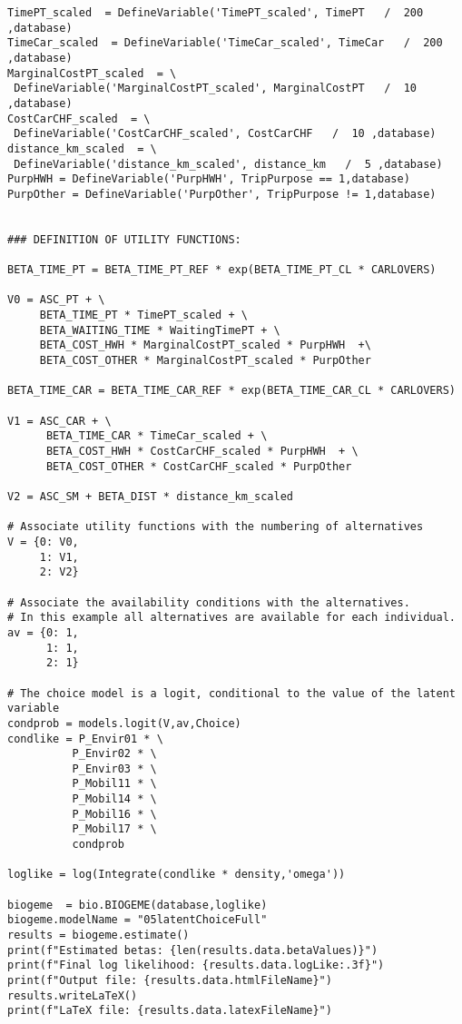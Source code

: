 \documentclass[12pt,a4paper]{article}
\begin{document}
\begin{lstlisting}[style=numbers]
TimePT_scaled  = DefineVariable('TimePT_scaled', TimePT   /  200 ,database)
TimeCar_scaled  = DefineVariable('TimeCar_scaled', TimeCar   /  200 ,database)
MarginalCostPT_scaled  = \
 DefineVariable('MarginalCostPT_scaled', MarginalCostPT   /  10 ,database)
CostCarCHF_scaled  = \
 DefineVariable('CostCarCHF_scaled', CostCarCHF   /  10 ,database)
distance_km_scaled  = \
 DefineVariable('distance_km_scaled', distance_km   /  5 ,database)
PurpHWH = DefineVariable('PurpHWH', TripPurpose == 1,database)
PurpOther = DefineVariable('PurpOther', TripPurpose != 1,database)


### DEFINITION OF UTILITY FUNCTIONS:

BETA_TIME_PT = BETA_TIME_PT_REF * exp(BETA_TIME_PT_CL * CARLOVERS)

V0 = ASC_PT + \
     BETA_TIME_PT * TimePT_scaled + \
     BETA_WAITING_TIME * WaitingTimePT + \
     BETA_COST_HWH * MarginalCostPT_scaled * PurpHWH  +\
     BETA_COST_OTHER * MarginalCostPT_scaled * PurpOther

BETA_TIME_CAR = BETA_TIME_CAR_REF * exp(BETA_TIME_CAR_CL * CARLOVERS)

V1 = ASC_CAR + \
      BETA_TIME_CAR * TimeCar_scaled + \
      BETA_COST_HWH * CostCarCHF_scaled * PurpHWH  + \
      BETA_COST_OTHER * CostCarCHF_scaled * PurpOther 

V2 = ASC_SM + BETA_DIST * distance_km_scaled

# Associate utility functions with the numbering of alternatives
V = {0: V0,
     1: V1,
     2: V2}

# Associate the availability conditions with the alternatives.
# In this example all alternatives are available for each individual.
av = {0: 1,
      1: 1,
      2: 1}

# The choice model is a logit, conditional to the value of the latent variable
condprob = models.logit(V,av,Choice)
condlike = P_Envir01 * \
          P_Envir02 * \
          P_Envir03 * \
          P_Mobil11 * \
          P_Mobil14 * \
          P_Mobil16 * \
          P_Mobil17 * \
          condprob

loglike = log(Integrate(condlike * density,'omega'))

biogeme  = bio.BIOGEME(database,loglike)
biogeme.modelName = "05latentChoiceFull"
results = biogeme.estimate()
print(f"Estimated betas: {len(results.data.betaValues)}")
print(f"Final log likelihood: {results.data.logLike:.3f}")
print(f"Output file: {results.data.htmlFileName}")
results.writeLaTeX()
print(f"LaTeX file: {results.data.latexFileName}")
\end{lstlisting}
\end{document}
